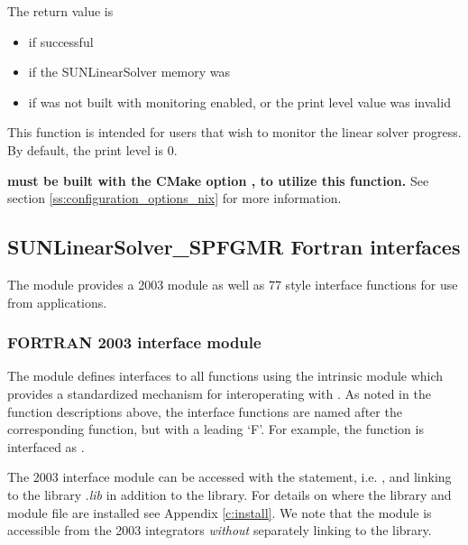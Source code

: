 {
  The return value is
  \begin{itemize}
    \item {} if successful
    \item {} if the SUNLinearSolver memory was 
    \item {} if {\sundials} was not built with monitoring enabled,
      or the print level value was invalid
  \end{itemize}
}
{
  This function is intended for users that wish to monitor the linear
  solver progress. By default, the print level is 0.

  \textbf{{\sundials} must be built with the CMake option
  , to utilize this function.}
  See section \ref{ss:configuration_options_nix} for more information.
}


\subsection{SUNLinearSolver\_SPFGMR Fortran interfaces}
\label{ss:sunlinsol_spfgmr_fortran}

The {\sunlinsolspfgmr} module provides a {\F} 2003 module as well as {\F} 77
style interface functions for use from {\F} applications.

\subsubsection*{FORTRAN 2003 interface module}
The  {\F} module defines interfaces to all
{\sunlinsolspfgmr} {\CC} functions using the intrinsic 
module which provides a standardized mechanism for interoperating with {\CC}. As
noted in the {\CC} function descriptions above, the interface functions are
named after the corresponding {\CC} function, but with a leading `F'. For
example, the function  is interfaced as
.

The {\F} 2003 {\sunlinsolspfgmr} interface module can be accessed with the 
statement, i.e. , and linking to the library
.{\em lib} in addition to the {\CC} library.
For details on where the library and module file \newline
{} are installed see Appendix \ref{c:install}.
We note that the module is accessible from the {\F} 2003 {\sundials} integrators
\textit{without} separately linking to the \newline
{} library.

